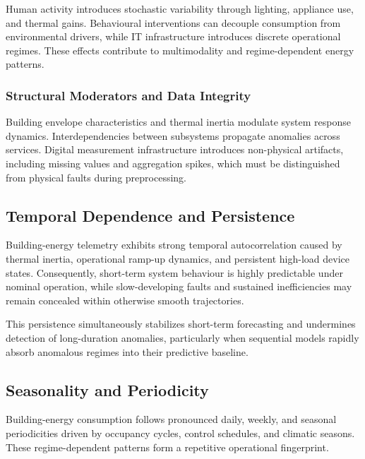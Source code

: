 Human activity introduces stochastic variability through lighting, appliance use, and thermal gains. Behavioural interventions can decouple consumption from environmental drivers, while IT infrastructure introduces discrete operational regimes. These effects contribute to multimodality and regime-dependent energy patterns.

\subsubsection{Structural Moderators and Data Integrity}
\label{subsec:structural-technical-influences}

Building envelope characteristics and thermal inertia modulate system response dynamics. Interdependencies between subsystems propagate anomalies across services. Digital measurement infrastructure introduces non-physical artifacts, including missing values and aggregation spikes, which must be distinguished from physical faults during preprocessing.


\subsection{Temporal Dependence and Persistence}
\label{subsec:temporal-autocorrelation-persistence}

Building-energy telemetry exhibits strong temporal autocorrelation caused by thermal inertia, operational ramp-up dynamics, and persistent high-load device states. Consequently, short-term system behaviour is highly predictable under nominal operation, while slow-developing faults and sustained inefficiencies may remain concealed within otherwise smooth trajectories.

This persistence simultaneously stabilizes short-term forecasting and undermines detection of long-duration anomalies, particularly when sequential models rapidly absorb anomalous regimes into their predictive baseline.

\subsection{Seasonality and Periodicity}
\label{subsec:periodic-variations-seasonality}

Building-energy consumption follows pronounced daily, weekly, and seasonal periodicities driven by occupancy cycles, control schedules, and climatic seasons. These regime-dependent patterns form a repetitive operational fingerprint.

